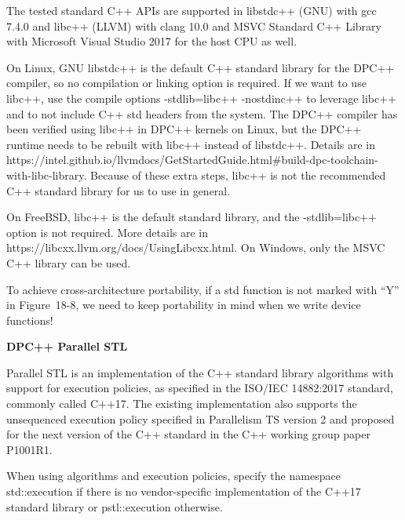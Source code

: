 The tested standard C++ APIs are supported in libstdc++ (GNU) with gcc 7.4.0 and libc++ (LLVM) with clang 10.0 and MSVC Standard C++ Library with Microsoft Visual Studio 2017 for the host CPU as well.\par

On Linux, GNU libstdc++ is the default C++ standard library for the DPC++ compiler, so no compilation or linking option is required. If we want to use libc++, use the compile options -stdlib=libc++ -nostdinc++ to leverage libc++ and to not include C++ std headers from the system. The DPC++ compiler has been verified using libc++ in DPC++ kernels on Linux, but the DPC++ runtime needs to be rebuilt with libc++ instead of libstdc++. Details are in https://intel.github.io/llvmdocs/GetStartedGuide.html\#build-dpc-toolchain-with-libc-library. Because of these extra steps, libc++ is not the recommended C++ standard library for us to use in general.\par

On FreeBSD, libc++ is the default standard library, and the -stdlib=libc++ option is not required. More details are in https://libcxx.llvm.org/docs/UsingLibcxx.html. On Windows, only the MSVC C++ library can be used.\par

\begin{tcolorbox}[colback=red!5!white,colframe=red!75!black]
To achieve cross-architecture portability, if a std function is not marked with “Y” in Figure 18-8, we need to keep portability in mind when we write device functions!
\end{tcolorbox}

\hspace*{\fill} \par %
\textbf{DPC++ Parallel STL}

Parallel STL is an implementation of the C++ standard library algorithms with support for execution policies, as specified in the ISO/IEC 14882:2017 standard, commonly called C++17. The existing implementation also supports the unsequenced execution policy specified in Parallelism TS version 2 and proposed for the next version of the C++ standard in the C++ working group paper P1001R1.\par

When using algorithms and execution policies, specify the namespace std::execution if there is no vendor-specific implementation of the C++17 standard library or pstl::execution otherwise.\par

